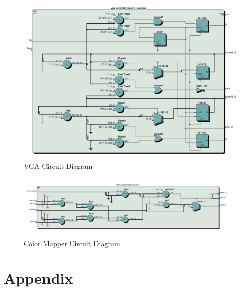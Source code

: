\documentclass[journal, twocolumn, final,11pt,letterpaper]{IEEEtran}
\begin{document}
\begin{figure} [H]
	\centering
	\includegraphics[scale=.5]{vga_diagram.png}
	\caption{VGA Circuit Diagram\label{fig:vga}}
\end{figure}

\begin{figure} [H]
	\centering
	\includegraphics[scale=.5]{color_mapper_diagram.png}
	\caption{Color Mapper Circuit Diagram\label{fig:color_mapper}}
\end{figure}            

     

\section*{Appendix}
\end{document}

